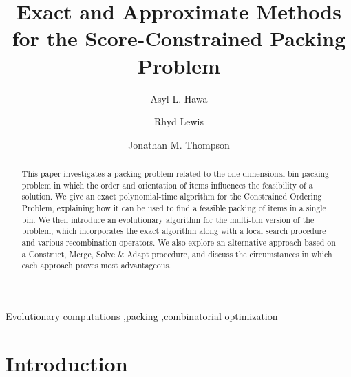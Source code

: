 \documentclass[a4paper,11pt,authoryear]{elsarticle}
\begin{document}
	
\begin{frontmatter}
\title{Exact and Approximate Methods for the Score-Constrained Packing Problem}
\author[1]{Asyl L. Hawa}
\address[1]{Southampton Business School, University of Southampton, Southampton SO17 1BJ, UK}

\author[2]{Rhyd Lewis}
\author[2]{Jonathan M. Thompson}
\address[2]{School of Mathematics, Cardiff University, Senghennydd Road, Cardiff, CF24 4AG, UK}

\begin{abstract}
This paper investigates a packing problem related to the one-dimensional bin packing problem in which the order and orientation of items influences the feasibility of a solution. We give an exact polynomial-time algorithm for the Constrained Ordering Problem, explaining how it can be used to find a feasible packing of items in a single bin. We then introduce an evolutionary algorithm for the multi-bin version of the problem, which incorporates the exact algorithm along with a local search procedure and various recombination operators. We also explore an alternative approach based on a Construct, Merge, Solve $\&$ Adapt procedure, and discuss the circumstances in which each approach proves most advantageous.
\end{abstract}

\begin{keyword}
	Evolutionary computations \sep packing \sep combinatorial optimization
\end{keyword}

\end{frontmatter}

\section{Introduction}
\label{sec:intro}
\end{document}
